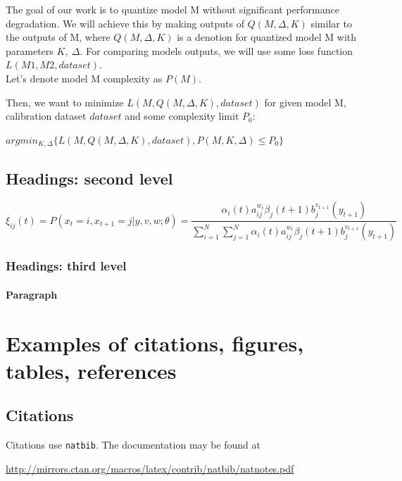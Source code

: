 \documentclass{article}
\begin{document}
The goal of our work is to quantize model M without significant performance degradation. We will achieve this by making  outputs of $Q(M, \Delta, K)$ similar to the outputs of M, where $Q(M, \Delta, K)$ is a denotion for quantized model M with parameters $K,\ \Delta$. For comparing models outputs, we will use some loss function $L(M1, M2, dataset)$. \\

Let's denote model M complexity as $P(M)$.

Then, we want to minimize $L(M, Q(M, \Delta, K), dataset)$  for given model M, calibration dataset $dataset$ and some complexity limit $P_0$:

$argmin_{K, \Delta} \{L(M, Q(M, \Delta, K), dataset),  P(M, K, \Delta) \leq P_0\}$

\subsection{Headings: second level}
\lipsum[5]
\begin{equation}
	\xi _{ij}(t)=P(x_{t}=i,x_{t+1}=j|y,v,w;\theta)= {\frac {\alpha _{i}(t)a^{w_t}_{ij}\beta _{j}(t+1)b^{v_{t+1}}_{j}(y_{t+1})}{\sum _{i=1}^{N} \sum _{j=1}^{N} \alpha _{i}(t)a^{w_t}_{ij}\beta _{j}(t+1)b^{v_{t+1}}_{j}(y_{t+1})}}
\end{equation}

\subsubsection{Headings: third level}
\lipsum[6]

\paragraph{Paragraph}
\lipsum[7]



\section{Examples of citations, figures, tables, references}
\label{sec:others}

\subsection{Citations}
Citations use \verb+natbib+. The documentation may be found at
\begin{center}
	\url{http://mirrors.ctan.org/macros/latex/contrib/natbib/natnotes.pdf}
\end{center}
\end{document}
